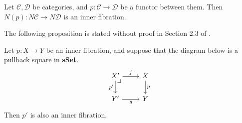 \documentclass{MetricNotes2023}
\begin{document}
\begin{example}\label{ex:inner}
Let \(\mathcal{C}, \mathcal{D}\) be categories, and \(p : \mathcal{C} \to \mathcal{D}\) be a functor between them. Then \(N(p) : N \mathcal{C} \to N \mathcal{D}\) is an inner fibration.
\end{example}

The following proposition is stated without proof in Section 2.3 of \autocite{lurie2008higher}.

\begin{proposition}\label{pullback}
Let \(p : X \to Y\) be an inner fibration, and suppose that the diagram below is a pullback square in \textbf{sSet}.
\[\begin{tikzcd}
X' \arrow[r, "f"] \arrow[d, swap, "p'"] \arrow[dr, phantom, "\scalebox{1.3}{$\lrcorner$}" {xshift=-16pt, yshift=10pt}] & X \arrow[d, "p"]  \\
Y' \arrow[r, swap, "g"]  & Y
\end{tikzcd}\]
Then \(p'\) is also an inner fibration. 
\end{proposition}
\end{document}
